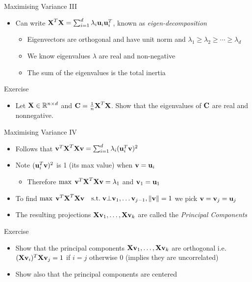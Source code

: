 \documentclass{beamer}
\begin{document}
\begin{frame}{Maximising Variance III}  
\begin{itemize} 
 \item Can write $\textbf{X}^T\textbf{X} = \sum_{i=1}^d \lambda_i \textbf{u}_i \textbf{u}_i^T$, known as \emph{eigen-decomposition}
  \begin{itemize} 
  \item Eigenvectors are orthogonal and have unit norm and $\lambda_1 \geq \lambda_2 \geq \cdots \geq \lambda_d$ 
  \item We know eigenvalues $\lambda$ are real and non-negative 
  \item The sum of the eigenvalues is the total inertia 
  \end{itemize} 
\end{itemize}
\end{frame}

\begin{frame}{Exercise}
\begin{itemize} 
 \item Let $\textbf{X} \in \mathbb{R}^{n \times d}$ and $\textbf{C} = \frac{1}{n} \textbf{X}^T\textbf{X}$. Show that the eigenvalues of $\textbf{C}$ are real and nonnegative. 
\end{itemize}
\end{frame}


\begin{frame}{Maximising Variance IV}  
\begin{itemize}
\item Follows that $\textbf{v}^T\textbf{X}^T\textbf{X}\textbf{v} = \sum_{i=1}^d \lambda_i (\textbf{u}_i^T\textbf{v})^2$
\item Note $(\textbf{u}_i^T\textbf{v})^2$ is 1 (its max value) when $\textbf{v} = \textbf{u}_i$
\begin{itemize}
\item Therefore $\max \; \textbf{v}^T\textbf{X}^T\textbf{X}\textbf{v} = \lambda_1$ and $\textbf{v}_1 = \textbf{u}_1$
\end{itemize}
\item To find $\max \; \textbf{v}^T\textbf{X}^T\textbf{X}\textbf{v} \quad \mbox{s.t.} \;  \textbf{v} \bot \textbf{v}_1, \ldots \textbf{v}_{j-1}, \|\textbf{v} \|  = 1$ we pick $\textbf{v} = \textbf{v}_{j} = \textbf{u}_{j}$
\item The resulting projections $\textbf{X}\textbf{v}_1, \ldots, \textbf{X}\textbf{v}_k$ are called the \emph{Principal Components} 
\end{itemize}
\end{frame}

\begin{frame}{Exercise}  
\begin{itemize} 
 \item Show that the principal components $\textbf{X}\textbf{v}_1, \ldots, \textbf{X}\textbf{v}_k$ are orthogonal i.e. $(\textbf{X}\textbf{v}_i)^T\textbf{X}\textbf{v}_j = 1$ if $i=j$ otherwise $0$ (implies they are uncorrelated)
 \item Show also that the principal components are centered 
\end{itemize}
\end{frame}
\end{document}
